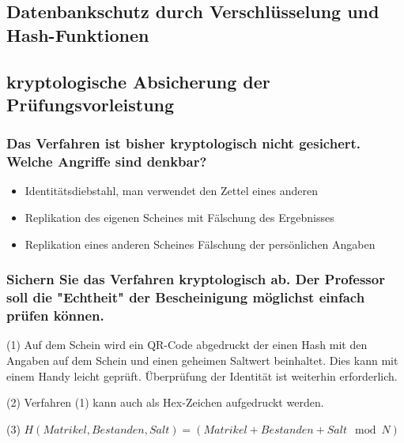 \subsection{Datenbankschutz durch Verschlüsselung und Hash-Funktionen}

\lstset{language=SQL}




\subsection{kryptologische Absicherung der Prüfungsvorleistung}
\subsubsection{Das Verfahren ist bisher kryptologisch nicht gesichert. Welche Angriffe sind denkbar?}
\begin{itemize}
\item Identitätsdiebstahl, man verwendet den Zettel eines anderen
\item Replikation des eigenen Scheines mit Fälschung des Ergebnisses
\item Replikation eines anderen Scheines Fälschung der persönlichen Angaben
\end{itemize}

\subsubsection{Sichern Sie das Verfahren kryptologisch ab. 
               Der Professor soll die "Echtheit" der Bescheinigung möglichst einfach prüfen können.}
               
(1) Auf dem Schein wird ein QR-Code abgedruckt der einen Hash mit den Angaben auf dem Schein und einen geheimen Saltwert beinhaltet. Dies kann mit einem Handy leicht geprüft. Überprüfung der Identität ist weiterhin erforderlich.

(2) Verfahren (1) kann auch als Hex-Zeichen aufgedruckt werden.

(3) $H(Matrikel,Bestanden,Salt) = (Matrikel+Bestanden+Salt \mod N)$